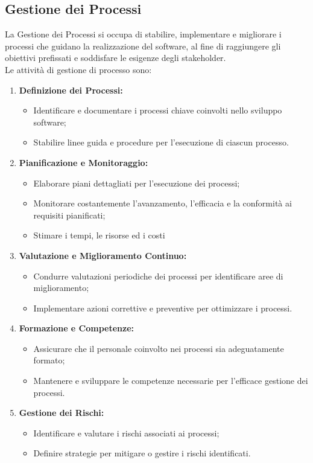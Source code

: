 \documentclass{article}
\begin{document}
\subsection{Gestione dei Processi}
La Gestione dei Processi si occupa di stabilire, implementare e migliorare i processi che guidano la realizzazione del software, al fine di raggiungere gli obiettivi prefissati e soddisfare le esigenze degli stakeholder.
\\
Le attività di gestione di processo sono:
\begin{enumerate}
    \item \textbf{Definizione dei Processi:}
      \begin{itemize}
        \item Identificare e documentare i processi chiave coinvolti nello sviluppo software;
        \item Stabilire linee guida e procedure per l'esecuzione di ciascun processo.
      \end{itemize}
  
    \item \textbf{Pianificazione e Monitoraggio:}
      \begin{itemize}
        \item Elaborare piani dettagliati per l'esecuzione dei processi;
        \item Monitorare costantemente l'avanzamento, l'efficacia e la conformità ai requisiti pianificati;
        \item Stimare i tempi, le risorse ed i costi
      \end{itemize}
  
    \item \textbf{Valutazione e Miglioramento Continuo:}
      \begin{itemize}
        \item Condurre valutazioni periodiche dei processi per identificare aree di miglioramento;
        \item Implementare azioni correttive e preventive per ottimizzare i processi.
      \end{itemize}
  
    \item \textbf{Formazione e Competenze:}
      \begin{itemize}
        \item Assicurare che il personale coinvolto nei processi sia adeguatamente formato;
        \item Mantenere e sviluppare le competenze necessarie per l'efficace gestione dei processi.
      \end{itemize}
  
    \item \textbf{Gestione dei Rischi:}
      \begin{itemize}
        \item Identificare e valutare i rischi associati ai processi;
        \item Definire strategie per mitigare o gestire i rischi identificati.
      \end{itemize}
  \end{enumerate}
  
\end{document}
